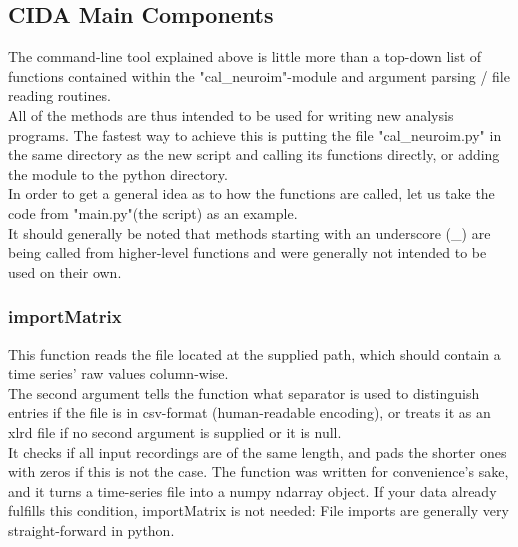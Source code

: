 \documentclass[titlepage]{article}
\begin{document}
\subsection{CIDA Main Components}
The command-line tool explained above is little more than a top-down list of functions contained within the "cal\_neuroim"-module and argument parsing / file reading routines.\\
All of the methods are thus intended to be used for writing new analysis programs. The fastest way to achieve this is putting the file "cal\_neuroim.py" in the same directory as the new script and calling its functions directly, or adding the module to the python directory.\\
In order to get a general idea as to how the functions are called, let us take the code from "main.py"(the script) as an example.\\
It should generally be noted that methods starting with an underscore (\_) are being called from higher-level functions and were generally not intended to be used on their own.
\subsubsection{importMatrix}
This function reads the file located at the supplied path, which should contain a time series' raw values column-wise.\\
The second argument tells the function what separator is used to distinguish entries if the file is in csv-format (human-readable encoding), or treats it as an xlrd file if no second argument is supplied or it is null.\\
It checks if all input recordings are of the same length, and pads the shorter ones with zeros if this is not the case.
The function was written for convenience's sake, and it turns a time-series file into a numpy ndarray object. If your data already fulfills this condition, importMatrix is not needed: File imports are generally very straight-forward in python.
\end{document}
